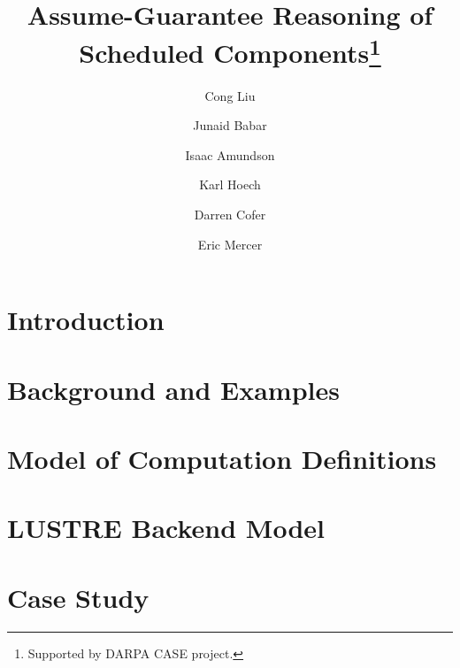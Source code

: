 \documentclass[runningheads]{llncs}
\begin{document}
%
\title{Assume-Guarantee Reasoning of Scheduled Components\thanks{Supported by DARPA CASE project.}}
%
%
\author{
     Cong Liu 
\and Junaid Babar 
\and Isaac Amundson 
\and Karl Hoech 
\and Darren Cofer
\and Eric Mercer}
%
%
%
\maketitle              %
%
\begin{abstract}

\end{abstract}

\section{Introduction}


\section{Background and Examples}
\label{example}


\section{Model of Computation Definitions}
\label{async}


\section{LUSTRE Backend Model	}
\label{lustre}


\section{Case Study}
\label{case-study}

\end{document}
